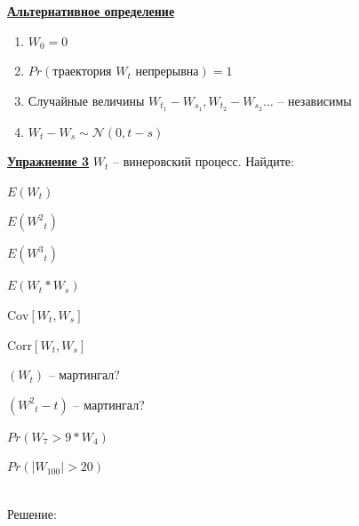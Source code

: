 \documentclass[a4paper]{article}
\begin{document}
\par {\bf\underline{Альтернативное определение}}
\begin{enumerate}
 \item  ${W}_0=0$
 \item  $Pr(\text{траектория ${W}_t$ непрерывна})=1$
 \item  Случайные величины ${W}_{t_1}-{W}_{s_1}, {W}_{t_2}-{W}_{s_2} \dots$ -- независимы
 \item  ${W}_t-{W}_s \sim \mathcal{N}(0,t-s)$
 \end{enumerate}
\par {\bf\underline{Упражнение 3}}  ${W}_t$ -- винеровский процесс. Найдите: \begin{enumerate*}[font={\color{red!50!black}\bfseries}] \item $E({W}_t)$ \item $E({{W}^2}_t)$ \item $E({{W}^3}_t)$  \item $E({W}_t*{W}_s)$ \item $\text{Cov}[{W}_t,{W}_s]$ \item $\text{Corr}[{W}_t,{W}_s]$ \item $({W}_t)$ -- мартингал?  \item $({{W}^2}_t-t)$ -- мартингал? \item $Pr({W}_7>9*{W}_4)$ \item $Pr(\lvert {W}_{100}\rvert >20)$ \end{enumerate*}
\\ Решение:
\end{document}
